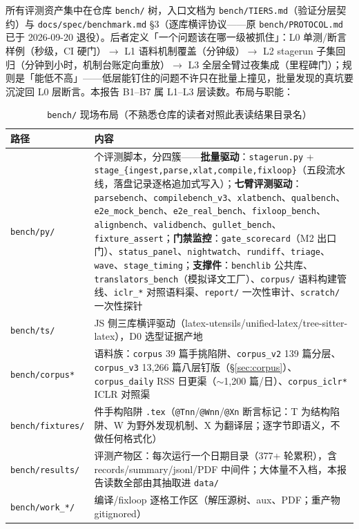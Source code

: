 所有评测资产集中在仓库 \texttt{bench/} 树，入口文档为 \texttt{bench/TIERS.md}（验证分层契约）与 \texttt{docs/spec/benchmark.md} §3（逐库横评协议——原 \texttt{bench/PROTOCOL.md} 已于 2026-09-20 退役）。后者定义「一个问题该在哪一级被抓住」：L0 单测/断言样例（秒级，CI 硬门）$\to$ L1 语料机制覆盖（分钟级）$\to$ L2 stagerun 子集回归（分钟到小时，机制台账定向重放）$\to$ L3 全层全臂过夜集成（里程碑门）；规则是「能低不高」——低层能钉住的问题不许只在批量上撞见，批量发现的真坑要沉淀回 L0 层断言。本报告 B1--B7 属 L1--L3 层读数。布局与职能：

\begin{table}[htbp]
\centering\small
\caption{\texttt{bench/} 现场布局（不熟悉仓库的读者对照此表读结果目录名）}
\label{tab:benchlayout}
\begin{tabular}{@{}l>{\raggedright\arraybackslash}p{10.8cm}@{}}
\toprule
路径 & 内容 \\
\midrule
\texttt{bench/py/} & 37 个评测脚本，分四簇——\textbf{批量驱动}：\texttt{stagerun.py} + \texttt{stage\_\{ingest,parse,xlat,compile,fixloop\}}（五段流水线，落盘记录逐格追加式写入）；\textbf{七臂评测驱动}：\texttt{parsebench}、\texttt{compilebench\_v3}、\texttt{xlatbench}、\texttt{qualbench}、\texttt{e2e\_mock\_bench}、\texttt{e2e\_real\_bench}、\texttt{fixloop\_bench}、\texttt{alignbench}、\texttt{validbench}、\texttt{gullet\_bench}、\texttt{fixture\_assert}；\textbf{门禁监控}：\texttt{gate\_scorecard}（M2 出口门）、\texttt{status\_panel}、\texttt{nightwatch}、\texttt{rundiff}、\texttt{triage}、\texttt{wave}、\texttt{stage\_timing}；\textbf{支撑件}：\texttt{benchlib} 公共库、\texttt{translators\_bench}（模拟译文工厂）、\texttt{corpus/} 语料构建管线、\texttt{iclr\_*} 对照语料渠、\texttt{report/} 一次性审计、\texttt{scratch/} 一次性探针 \\
\texttt{bench/ts/} & JS 侧三库横评驱动（latex-utensils/unified-latex/tree-sitter-latex），D0 选型证据产地 \\
\texttt{bench/corpus*} & 语料族：\texttt{corpus} 39 篇手挑陷阱、\texttt{corpus\_v2} 139 篇分层、\texttt{corpus\_v3} 13{,}266 篇八层钉版（\S\ref{sec:corpus}）、\texttt{corpus\_daily} RSS 日更渠（$\sim$1{,}200 篇/日）、\texttt{corpus\_iclr*} ICLR 对照渠 \\
\texttt{bench/fixtures/} & 10 件手构陷阱 \texttt{.tex}（\texttt{@Tnn}/\texttt{@Wnn}/\texttt{@Xn} 断言标记：T 为结构陷阱、W 为野外发现机制、X 为翻译层；逐字节即语义，不做任何格式化） \\
\texttt{bench/results/} & 评测产物区：每次运行一个日期目录（377+ 轮累积），含 records/summary/jsonl/PDF 中间件；大体量不入档，本报告读数全部由其抽取进 \texttt{data/} \\
\texttt{bench/work\_*/} & 编译/fixloop 逐格工作区（解压源树、aux、PDF；重产物 gitignored） \\
\bottomrule
\end{tabular}
\end{table}

